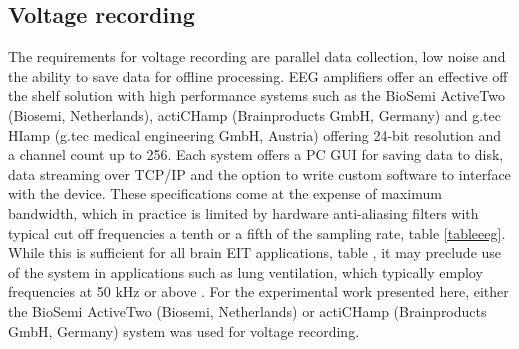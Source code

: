 \subsection{Voltage recording}
The requirements for voltage recording are parallel data collection, low noise and the ability to save data for offline processing. EEG amplifiers offer an effective off the shelf solution with high performance systems such as the BioSemi ActiveTwo (Biosemi, Netherlands), actiCHamp (Brainproducts GmbH, Germany) and g.tec HIamp (g.tec medical engineering GmbH, Austria) offering 24-bit resolution and a channel count up to 256. Each system offers a PC GUI for saving data to disk, data streaming over TCP/IP and the option to write custom software to interface with the device. These specifications come at the expense of maximum bandwidth, which in practice is limited by hardware anti-aliasing filters with typical cut off frequencies a tenth or a fifth of the sampling rate, table \ref{tableeeg}. While this is sufficient for all brain EIT applications, table \label{table_requirements}, it may preclude use of the system in applications such as lung ventilation, which typically employ frequencies at 50 kHz or above \cite{Frerichs_2000}. For the experimental work presented here, either the BioSemi ActiveTwo (Biosemi, Netherlands) or actiCHamp (Brainproducts GmbH, Germany) system was used for voltage recording. 
